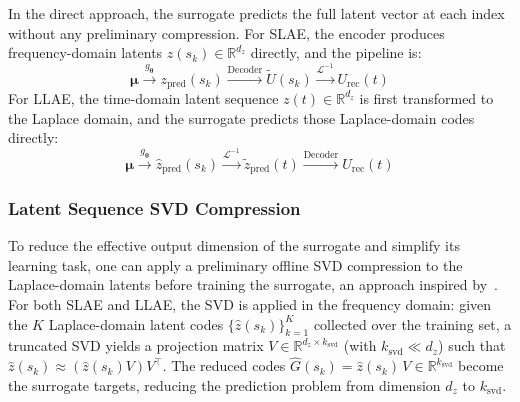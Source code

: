 ﻿\documentclass[a4paper,12pt]{article}
\theoremstyle{definition}
\theoremstyle{remark}
\newcommand{\vmu}{\bm{\mu}}
\newcommand{\R}{\mathbb{R}}
\begin{document}
In the direct approach, the surrogate predicts the full latent vector at each index without any preliminary compression. For SLAE, the encoder produces frequency-domain latents $z(s_k) \in \R^{d_z}$ directly, and the pipeline is:
\begin{equation}
    \vmu \xrightarrow{g_{\bm{\theta}}} z_{\text{pred}}(s_k) \xrightarrow{\text{Decoder}} \tilde{U}(s_k) \xrightarrow{\mathcal{L}^{-1}} U_{\text{rec}}(t)
\end{equation}
For LLAE, the time-domain latent sequence $z(t) \in \R^{d_z}$ is first transformed to the Laplace domain, and the surrogate predicts those Laplace-domain codes directly:
\begin{equation}
    \vmu \xrightarrow{g_{\bm{\theta}}} \hat{z}_{\text{pred}}(s_k) \xrightarrow{\mathcal{L}^{-1}} \tilde{z}_{\text{pred}}(t) \xrightarrow{\text{Decoder}} U_{\text{rec}}(t)
\end{equation}

\subsubsection{Latent Sequence SVD Compression}
\label{sec:svd_compression}

To reduce the effective output dimension of the surrogate and simplify its learning task, one can apply a preliminary offline SVD compression to the Laplace-domain latents before training the surrogate, an approach inspired by~\cite{mounayer2025}. For both SLAE and LLAE, the SVD is applied in the frequency domain: given the $K$ Laplace-domain latent codes $\{\hat{z}(s_k)\}_{k=1}^{K}$ collected over the training set, a truncated SVD yields a projection matrix $V \in \R^{d_z \times k_{\mathrm{svd}}}$ (with $k_{\mathrm{svd}} \ll d_z$) such that $\hat{z}(s_k) \approx (\hat{z}(s_k) V) V^\top$. The reduced codes $\hat{G}(s_k) = \hat{z}(s_k)\, V \in \R^{k_{\mathrm{svd}}}$ become the surrogate targets, reducing the prediction problem from dimension $d_z$ to $k_{\mathrm{svd}}$.
\end{document}
